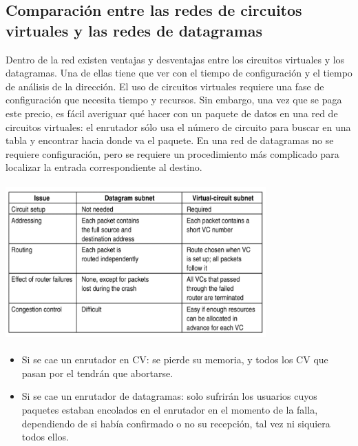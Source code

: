 \documentclass[10pt,a4paper]{report}
\begin{document}
\subsection{Comparación entre las redes de circuitos virtuales y las redes de datagramas}
	Dentro de la red existen ventajas y desventajas entre los circuitos virtuales y los 
	datagramas. Una de ellas tiene que ver con el tiempo de configuración y el tiempo de 
	análisis de la dirección. El uso de circuitos virtuales requiere una fase de 
	configuración que necesita tiempo y recursos. Sin embargo, una vez que se paga 
	este precio, es fácil averiguar qué hacer con un paquete de datos en una red de 
	circuitos virtuales: el enrutador sólo usa el número de circuito para buscar en una 
	tabla y encontrar hacia donde va el paquete. En una red de datagramas no se 
	requiere configuración, pero se requiere un procedimiento más complicado para 
	localizar la entrada correspondiente al destino.

	\begin{center} 
		\includegraphics[width=10cm, height=6cm]{./imagenes/comparacion.png}
	\end{center}
	
	\begin{itemize}
		\item Si se cae un enrutador en CV: se pierde su memoria, y todos los CV que 
		pasan por el tendrán que abortarse.
		\item Si se cae un enrutador de datagramas: solo sufrirán los usuarios cuyos 
		paquetes estaban encolados en el enrutador en el momento de la falla, 
		dependiendo de si había confirmado o no su recepción, tal vez ni siquiera todos 
		ellos.
	\end{itemize}
\end{document}
